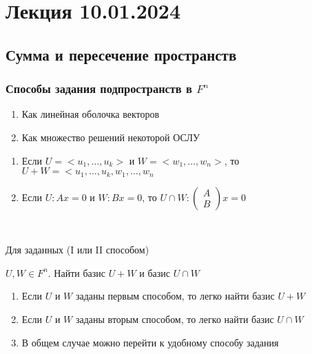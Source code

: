 \section{Лекция 10.01.2024}

\subsection{Сумма и пересечение пространств}

\subsubsection{Способы задания подпространств в $F^n$}

\begin{enumerate}
  \item Как линейная оболочка векторов
  \item Как множество решений некоторой ОСЛУ
\end{enumerate}

\begin{comment}~

    Переход между ними сводится к поиску ФСР
\end{comment}

\begin{lemma}

  \begin{enumerate}
    \item Если $U = <u_1, \dots, u_k>$ и $W = <w_1, \dots, w_n>$, то $U + W = <u_1, \dots, u_k, w_1, \dots, w_n$
    \item Если $U: Ax = 0$ и $W: Bx = 0$, то $U \cap W:
      \begin{pmatrix}
        A \\ B
      \end{pmatrix} x = 0$
  \end{enumerate}

\end{lemma}

\bigskip

\begin{problem}~

  Для заданных (I или II способом)

  $U, W \in F^n$. Найти базис $U + W$ и базис $U \cap W$

  \begin{enumerate}
    \item Если $U$ и $W$ заданы первым способом, то легко найти базис $U + W$
    \item Если $U$ и $W$ заданы вторым способом, то легко найти базис $U \cap W$
    \item В общем случае можно перейти к удобному способу задания
  \end{enumerate}

\end{problem}

